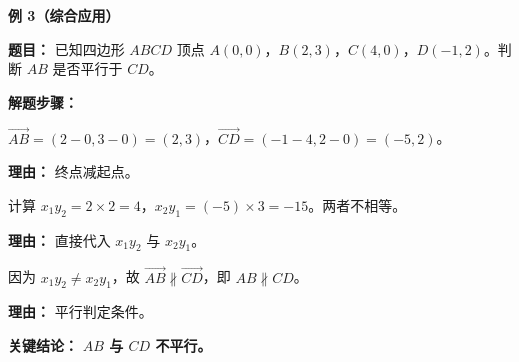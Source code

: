 \begin{examplebox}
	\medskip
	\textbf{\textcolor{CExample}{例 3（综合应用）}}

	\textbf{\textcolor{CExample}{题目：}}
	已知四边形 $ABCD$ 顶点 $A(0,0)$，$B(2,3)$，$C(4,0)$，$D(-1,2)$。判断 $AB$ 是否平行于 $CD$。

	\textbf{\textcolor{CExample}{解题步骤：}}
	\begin{description}[style=nextline, leftmargin=2.8em, labelsep=0.5em, itemsep=0.45em]
		\item[\textbf{第一步（求向量坐标）：}] $\overrightarrow{AB}=(2-0,3-0)=(2,3)$，$\overrightarrow{CD}=(-1-4,2-0)=(-5,2)$。
			\par\textbf{理由：} 终点减起点。
		\item[\textbf{第二步（计算交叉积）：}] 计算 $x_1y_2 = 2\times2 = 4$，$x_2y_1 = (-5)\times3 = -15$。两者不相等。
			\par\textbf{理由：} 直接代入 $x_1y_2$ 与 $x_2y_1$。
		\item[\textbf{第三步（得出结论）：}] 因为 $x_1y_2 \neq x_2y_1$，故 $\overrightarrow{AB}\not\parallel\overrightarrow{CD}$，即 $AB\not\parallel CD$。
			\par\textbf{理由：} 平行判定条件。
	\end{description}

	\textbf{\textcolor{CExample}{关键结论：}}
	\textbf{$AB$ 与 $CD$ 不平行。}
\end{examplebox}
